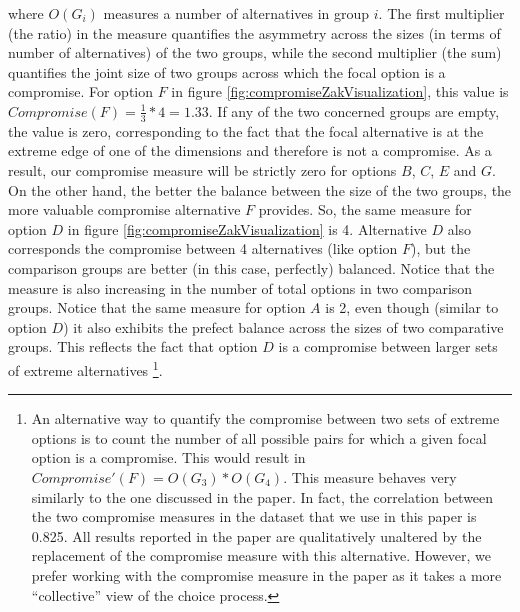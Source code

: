 \documentclass[a4paper,12pt]{article}
\begin{document}
where $O(G_i)$ measures a number of alternatives in group $i$. The first multiplier (the ratio) in the measure quantifies the asymmetry across the sizes (in terms of number of alternatives) of the two groups, while the second multiplier (the sum) quantifies the joint size of two groups across which the focal option is a compromise. For option $F$ in figure \ref{fig:compromiseZakVisualization}, this value is $Compromise(F) = \frac{1}{3} * 4 = 1.33$. If any of the two concerned groups are empty, the value is zero, corresponding to the fact that the focal alternative is at the extreme edge of one of the dimensions and therefore is not a compromise. As a result, our compromise measure will be strictly zero for options $B$, $C$, $E$ and $G$. On the other hand, the better the balance between the size of the two groups, the more valuable compromise alternative $F$ provides. So, the same measure for option $D$ in figure \ref{fig:compromiseZakVisualization} is 4. Alternative $D$ also corresponds the compromise between 4 alternatives (like option $F$), but the comparison groups are better (in this case, perfectly) balanced. Notice that the measure is also increasing in the number of total options in two comparison groups. Notice that the same measure for option $A$ is 2, even though (similar to option $D$) it also exhibits the prefect balance across the sizes of two comparative groups. This reflects the fact that option $D$ is a compromise between larger sets of extreme alternatives \footnote{An alternative way to quantify the compromise between two sets of extreme options is to count the number of all possible pairs for which a given focal option is a compromise. This would result in $Compromise'(F) = O(G_3) * O(G_4)$. This measure behaves very similarly to the one discussed in the paper. In fact, the correlation between the two compromise measures in the dataset that we use in this paper is 0.825. All results reported in the paper are qualitatively unaltered by the replacement of the compromise measure with this alternative. However, we prefer working with the compromise measure in the paper as it takes a more ``collective'' view of the choice process.}. 
\end{document}
